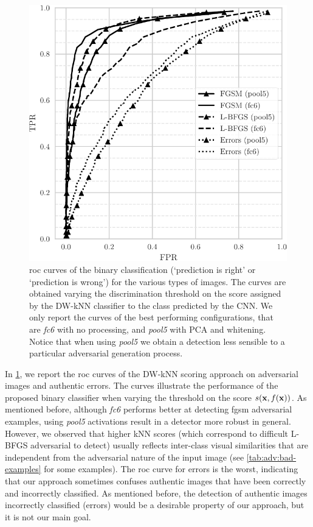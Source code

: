 \begin{figure}
\centering
\includegraphics[width=.85\linewidth]{roc}
\caption{\gls{roc} curves of the binary classification (`prediction is right' or `prediction is wrong') for the various types of images.
The curves are obtained varying the discrimination threshold on the score assigned by the DW-kNN classifier to the class predicted by the CNN.
We only report the curves of the best performing configurations, that are \emph{fc6} with no processing, and \emph{pool5} with PCA and whitening.
Notice that when using \emph{pool5} we obtain a detection less sensible to a particular adversarial generation process.
}
\label{fig:adv:roc}
\end{figure}

In \ref{fig:adv:roc}, we report the \acrfull{roc} curves of the DW-kNN scoring approach on adversarial images and authentic errors.
The curves illustrate the performance of the proposed binary classifier when varying the threshold on the score $s(\mathbf{x}, f(\mathbf{x}))$.
As mentioned before, although \emph{fc6} performs better at detecting \gls{fgsm} adversarial examples, using \emph{pool5} activations result in a detector more robust in general.
However, we observed that higher kNN scores (which correspond to difficult L-BFGS adversarial to detect) usually reflects inter-class visual similarities that are independent from the adversarial nature of the input image (see \ref{tab:adv:bad-examples} for some examples).
The \gls{roc} curve for errors is the worst, indicating that our approach sometimes confuses authentic images that have been correctly and incorrectly classified.
As mentioned before, the detection of authentic images incorrectly classified (errors) would be a desirable property of our approach, but it is not our main goal.

